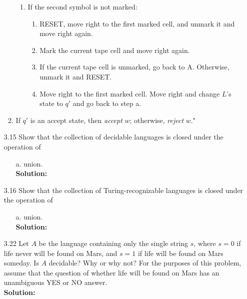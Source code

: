 \begin{enumerate}
\begin{enumerate}
\begin{enumerate}
\item If the second symbol is not marked:
\begin{enumerate}
\item RESET, move right to the first marked cell, and unmark it and move right again.
\item Mark the current tape cell and move right again.
\item If the current tape cell is unmarked, go back to A. Otherwise, unmark it and RESET.
\item Move right to the first marked cell. Move right and change $L$'s state to $q'$ and go back to step a.
\end{enumerate}
\end{enumerate}
\item If $q'$ is an accept state, then \emph{accept} $w$; otherwise, \emph{reject} $w$."
\end{enumerate}

\item[3.15]Show that the collection of decidable languages is closed under the operation of
\begin{enumerate}
\item[a.]union.
\\
\textbf{Solution:} \alreadyanswered
\end{enumerate}

\item[3.16]Show that the collection of Turing-recognizable languages is closed under the operation of
\begin{enumerate}
\item[a.]union.
\\
\textbf{Solution:} \alreadyanswered
\end{enumerate}

\item[3.22]Let $A$ be the language containing only the single string $s$, where $s = 0$ if life never will be found on Mars, and $s = 1$ if life will be found on Mars someday. Is $A$ decidable? Why or why not? For the purposes of this problem, assume that the question of whether life will be found on Mars has an unambiguous YES or NO answer.
\\
\textbf{Solution:} \alreadyanswered

\end{enumerate}